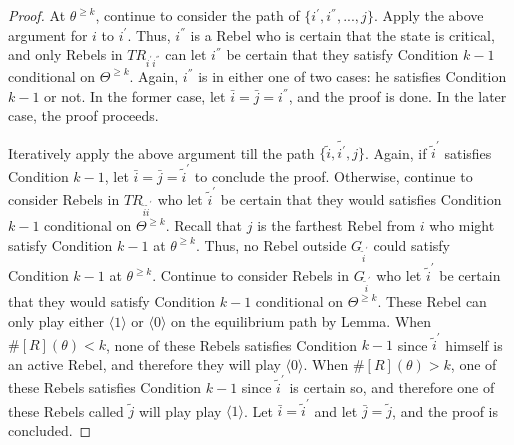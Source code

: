\documentclass[12pt,letter]{article}
\theoremstyle{definition}
\theoremstyle{remark}
\theoremstyle{claim}
\begin{document}
\begin{proof}
At $\theta^{\geq k}$, continue to consider the path of $\{i^{'},i^{''},...,j\}$. Apply the above argument for $i$ to $i^{'}$. Thus, $i^{''}$ is a Rebel who is certain that the state is critical, and only Rebels in $TR_{i^{'}i^{''}}$ can let $i^{''}$ be certain that they satisfy Condition $k-1$ conditional on $\Theta^{\geq k}$. Again, $i^{''}$ is in either one of two cases: he satisfies Condition $k-1$ or not. In the former case, let $\bar{i}=\bar{j}=i^{''}$, and the proof is done. In the later case, the proof proceeds. 

Iteratively apply the above argument till the path $\{\tilde{i},\tilde{i^{'}},j\}$. Again, if $\tilde{i}^{'}$ satisfies Condition $k-1$, let $\bar{i}=\bar{j}=\tilde{i}^{'}$ to conclude the proof. Otherwise, continue to consider Rebels in $TR_{\tilde{i}\tilde{i}^{'}}$ who let $\tilde{i}^{'}$ be certain that they would satisfies Condition $k-1$ conditional on $\Theta^{\geq k}$. Recall that $j$ is the farthest Rebel from $i$ who might satisfy Condition $k-1$ at $\theta^{\geq k}$. Thus, no Rebel outside $G_{\tilde{i}^{'}}$ could satisfy Condition $k-1$ at $\theta^{\geq k}$. Continue to consider Rebels in $G_{\tilde{i}^{'}}$ who let $\tilde{i}^{'}$ be certain that they would satisfy Condition $k-1$ conditional on $\Theta^{\geq k}$. These Rebel can only play either $\langle 1 \rangle$ or $\langle 0 \rangle$ on the equilibrium path by Lemma. When $\#[R](\theta)< k$, none of these Rebels satisfies Condition $k-1$ since $\tilde{i}^{'}$ himself is an active Rebel, and therefore they will play $\langle 0 \rangle$. When $\#[R](\theta)>k$, one of these Rebels satisfies Condition $k-1$ since $\tilde{i}^{'}$ is certain so, and therefore one of these Rebels called $\tilde{j}$ will play play $\langle 1 \rangle$. Let $\bar{i}=\tilde{i}^{'}$ and let $\bar{j}=\tilde{j}$, and the proof is concluded. 





\end{proof}
\end{document}
